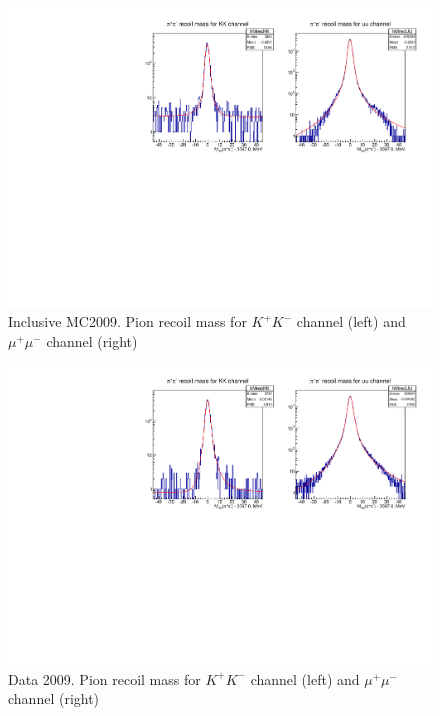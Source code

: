 \documentclass[a4paper,12pt]{article}
\newcommand{\uu}{\mu^{+}\mu^{-}}
\newcommand{\KK}{K^{+}K^{-}}
\begin{document}
\begin{figure}
\begin{center}
  \includegraphics[width=\textwidth]{fig/mc09-Mrec90MeV.pdf}
  \caption{Inclusive MC2009. Pion recoil mass for $\KK$ channel (left) and $\uu$ channel (right)}
  \label{fig:mc09-Mrec}
\end{center}
\end{figure}
\begin{figure}
\begin{center}
  \includegraphics[width=\textwidth]{fig/data09-Mrec90MeV.pdf}
  \caption{Data 2009. Pion recoil mass for $\KK$ channel (left) and $\uu$ channel (right)}
  \label{fig:data09-Mrec}
\end{center}
\end{figure}
\end{document}

